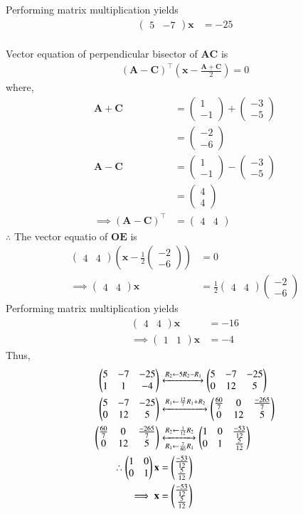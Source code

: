 \documentclass[journal,12pt,twocolumn]{IEEEtran}
\theoremstyle{remark}
\newcommand{\myvec}[1]{\ensuremath{\begin{pmatrix}#1\end{pmatrix}}}
\providecommand{\brak}[1]{\ensuremath{\left(#1\right)}}
\let\vec\mathbf
\begin{document}
Performing matrix multiplication yields
\begin{align}
\myvec{5&-7}\vec{x}&=-25
\end{align}\\
Vector equation of perpendicular bisector of $\vec{AC}$ is
\begin{align}
(\vec{A}-\vec{C})^\top\brak{ \vec{x} - \frac{\vec{A}+\vec{C}}{2}} = 0
\end{align}
where,
\begin{align}
\vec{A}+\vec{C}&=\myvec{1\\-1}+\myvec{-3\\-5}\\
&=\myvec{-2\\-6}\\
\vec{A}-\vec{C} &= \myvec{1\\-1}-\myvec{-3\\-5}\\
&=\myvec{4\\4}\\
\implies (\vec{A}-\vec{C})^\top &= \myvec{4&4}
\end{align}
$\therefore $ The vector equatio of $\vec{OE}$ is
\begin{align}
\myvec{4&4}\brak{ \vec{x}-\frac{1}{2}\myvec{-2\\-6}}&=0\\
\implies \myvec{4&4}\vec{x}&=\frac{1}{2}\myvec{4&4}\myvec{-2\\-6}
\end{align}
Performing matrix multiplication yields
\begin{align}
\myvec{4&4}\vec{x}&=-16\\
\implies \myvec{1&1}\vec{x}&=-4
\end{align}
Thus,
\begin{align}
\myvec{5&-7&-25\\1&1&-4} &\xleftrightarrow[]{R_2 \leftarrow 5R_2 - R_1} \myvec{5&-7&-25\\0&12&5}\\
\myvec{5&-7&-25\\0&12&5} &\xleftrightarrow[]{R_1\leftarrow \frac{12}{7}R_1 + R_2} \myvec{\frac{60}{7}&0& \frac{-265}{7}\\0&12&5}\\
\myvec{\frac{60}{7}&0& \frac{-265}{7}\\0&12&5} &\xleftrightarrow[R_1\leftarrow \frac{7}{60}R_1]{R_2 \leftarrow \frac{1}{12}R_2} \myvec{1&0& \frac{-53}{12}\\0&1&\frac{5}{12}}\\
\therefore \myvec{1&0\\0&1}\vec{x} &= \myvec{\frac{-53}{12}\\\frac{5}{12}}\\
\implies \vec{x}&=\myvec{\frac{-53}{12}\\\frac{5}{12}}
\end{align}
\end{document}
